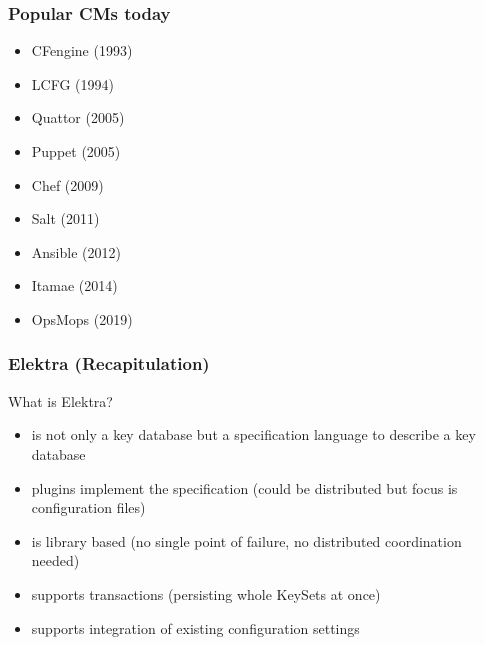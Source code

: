 \begin{frame}
	\frametitle{Popular CMs today}

	\begin{itemize} %
	\item CFengine (1993)
	\item LCFG (1994)
	\item Quattor (2005)
	\item Puppet (2005)
	\item Chef (2009)
	\item Salt (2011)
	\item Ansible (2012)
	\item Itamae (2014)
	\item OpsMops (2019)
	\end{itemize}
\end{frame}

\begin{frame}
	\frametitle{Elektra (Recapitulation)}

	\begin{task}
	What is Elektra?
	\end{task}

	\pause

	\begin{itemize}
	\item is not only a key database but a specification language to describe a key database
	\item plugins implement the specification (could be distributed but focus is configuration files)
	\item is library based (no single point of failure, no distributed coordination needed)
	\item supports transactions (persisting whole KeySets at once)
	\item supports integration of existing configuration settings
	\end{itemize}
\end{frame}


